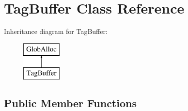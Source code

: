\hypertarget{classTagBuffer}{\section{Tag\-Buffer Class Reference}
\label{classTagBuffer}
}
Inheritance diagram for Tag\-Buffer\-:\begin{figure}[H]
\begin{center}
\leavevmode
\includegraphics[height=2.000000cm]{classTagBuffer}
\end{center}
\end{figure}
\subsection*{Public Member Functions}
